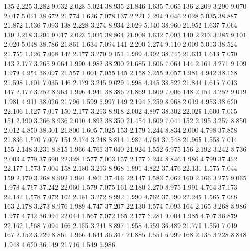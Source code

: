 \documentclass[a4paper,11pt]{scrartcl}
\begin{document}
\begin{Schunk}
\begin{Soutput}
135  2.225  3.282    9.032     2.028  5.024   38.935   21.846    1.635  7.065
136  2.209  3.290    9.070     2.017  5.021   38.672   21.774    1.626  7.078
137  2.221  3.294    9.046     2.028  5.035   38.887   21.872    1.636  7.093
138  2.228  3.274    8.934     2.029  5.040   38.960   21.952    1.637  7.064
139  2.218  3.291    9.017     2.023  5.025   38.864   21.908    1.632  7.093
140  2.213  3.285    9.101     2.020  5.048   38.786   21.861    1.634  7.094
141  2.200  3.274    9.110     2.009  5.013   38.524   21.755    1.626  7.068
142  2.177  3.270    9.151     1.989  4.992   38.245   21.633    1.613  7.070
143  2.177  3.265    9.064     1.990  4.982   38.200   21.685    1.606  7.064
144  2.161  3.271    9.109     1.979  4.954   38.097   21.557    1.601  7.055
145  2.158  3.255    9.057     1.981  4.942   38.138   21.598    1.601  7.035
146  2.179  3.245    9.029     1.998  4.945   38.522   21.844    1.615  7.013
147  2.177  3.252    8.963     1.996  4.941   38.386   21.869    1.609  7.006
148  2.151  3.252    9.019     1.981  4.911   38.026   21.796    1.599  6.997
149  2.194  3.259    8.968     2.019  4.953   38.620   22.106    1.627  7.017
150  2.177  3.263    8.918     2.002  4.897   38.302   22.026    1.600  7.035
151  2.190  3.266    8.936     2.010  4.892   38.350   21.454    1.609  7.041
152  2.195  3.257    8.850     2.012  4.850   38.301   21.800    1.605  7.025
153  2.179  3.244    8.834     2.000  4.798   37.858   21.836    1.570  7.007
154  2.174  3.248    8.814     1.987  4.764   37.548   21.965    1.558  7.014
155  2.148  3.231    8.815     1.966  4.766   37.040   21.924    1.552  6.975
156  2.192  3.242    8.736     2.003  4.779   37.690   22.328    1.577  7.003
157  2.177  3.244    8.846     1.986  4.799   37.422   22.177    1.573  7.004
158  2.180  3.263    8.968     1.991  4.822   37.476   22.131    1.575  7.044
159  2.179  3.268    8.992     1.991  4.801   37.416   22.147    1.583  7.062
160  2.166  3.275    9.065     1.978  4.797   37.242   22.060    1.579  7.075
161  2.180  3.270    8.975     1.991  4.764   37.173   22.182    1.578  7.072
162  2.181  3.272    8.992     1.990  4.762   37.190   22.245    1.565  7.088
163  2.178  3.273    8.976     1.989  4.747   37.207   22.130    1.574  7.093
164  2.165  3.268    8.986     1.977  4.712   36.994   22.044    1.567  7.072
165  2.177  3.281    9.004     1.985  4.707   36.879   22.162    1.568  7.094
166  2.155  3.241    8.897     1.958  4.659   36.489   21.770    1.550  7.019
167  2.152  3.229    8.861     1.966  4.644   36.347   21.885    1.551  6.999
168  2.135  3.228    8.848     1.948  4.620   36.149   21.716    1.549  6.986

\end{Soutput}
\end{Schunk}
\end{document}

